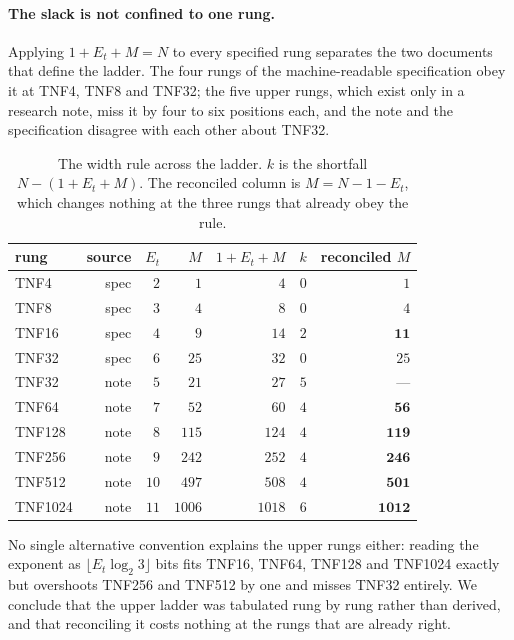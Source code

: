 \documentclass[11pt]{article}
\theoremstyle{definition}
\begin{document}
\paragraph{The slack is not confined to one rung.} Applying $1 + E_t + M = N$ to
every specified rung separates the two documents that define the ladder. The four
rungs of the machine-readable specification obey it at TNF4, TNF8 and TNF32;
the five upper rungs, which exist only in a research note, miss it by four to six
positions each, and the note and the specification disagree with each other about
TNF32.

\begin{table}[t]\centering
\caption{The width rule across the ladder. $k$ is the shortfall
$N - (1 + E_t + M)$. The reconciled column is $M = N - 1 - E_t$, which changes
nothing at the three rungs that already obey the rule.}
\label{tab:ladder-sweep}
\begin{tabular}{lrrrrrr}
\toprule
rung & source & $E_t$ & $M$ & $1{+}E_t{+}M$ & $k$ & reconciled $M$ \\
\midrule
TNF4    & spec & $2$  & $1$    & $4$    & $0$ & $1$ \\
TNF8    & spec & $3$  & $4$    & $8$    & $0$ & $4$ \\
TNF16   & spec & $4$  & $9$    & $14$   & $2$ & $\mathbf{11}$ \\
TNF32   & spec & $6$  & $25$   & $32$   & $0$ & $25$ \\
TNF32   & note & $5$  & $21$   & $27$   & $5$ & --- \\
TNF64   & note & $7$  & $52$   & $60$   & $4$ & $\mathbf{56}$ \\
TNF128  & note & $8$  & $115$  & $124$  & $4$ & $\mathbf{119}$ \\
TNF256  & note & $9$  & $242$  & $252$  & $4$ & $\mathbf{246}$ \\
TNF512  & note & $10$ & $497$  & $508$  & $4$ & $\mathbf{501}$ \\
TNF1024 & note & $11$ & $1006$ & $1018$ & $6$ & $\mathbf{1012}$ \\
\bottomrule
\end{tabular}
\end{table}

No single alternative convention explains the upper rungs either: reading the
exponent as $\lfloor E_t\log_2 3\rfloor$ bits fits TNF16, TNF64, TNF128 and
TNF1024 exactly but overshoots TNF256 and TNF512 by one and misses TNF32
entirely. We conclude that the upper ladder was tabulated rung by rung rather than
derived, and that reconciling it costs nothing at the rungs that are already
right.
\end{document}
